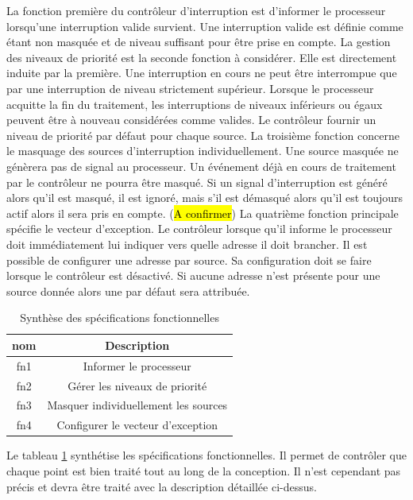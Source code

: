 \gap

La fonction première du contrôleur d'interruption est d'informer le processeur lorsqu'une interruption valide survient.
Une interruption valide est définie comme étant non masquée et de niveau suffisant pour être prise en compte.
La gestion des niveaux de priorité est la seconde fonction à considérer. 
Elle est directement induite par la première.
Une interruption en cours ne peut être interrompue que par une interruption de niveau strictement supérieur.
Lorsque le processeur acquitte la fin du traitement, les interruptions de niveaux inférieurs ou égaux peuvent être à nouveau considérées comme valides. 
Le contrôleur fournir un niveau de priorité par défaut pour chaque source.
La troisième fonction concerne le masquage des sources d'interruption individuellement.
Une source masquée ne génèrera pas de signal au processeur.
Un événement déjà en cours de traitement par le contrôleur ne pourra être masqué. %
Si un signal d'interruption est généré alors qu'il est masqué, il est ignoré, mais s'il est démasqué alors qu'il est toujours actif alors il sera pris en compte. (\hl{A confirmer})
La quatrième fonction principale spécifie le vecteur d'exception.
Le contrôleur lorsque qu'il informe le processeur doit immédiatement lui indiquer vers quelle adresse il doit brancher.
Il est possible de configurer une adresse par source.
Sa configuration doit se faire lorsque le contrôleur est désactivé.
Si aucune adresse n'est présente pour une source donnée alors une par défaut sera attribuée.

\begin{table}[H]
	\centering
	\begin{tabular}{|c|c|}
		\hline
		nom & Description \\ \hline
		fn1 & Informer le processeur \\ \hline
		fn2 & Gérer les niveaux de priorité \\ \hline
		fn3 & Masquer individuellement les sources \\ \hline
		fn4 & Configurer le vecteur d'exception \\ \hline
	\end{tabular}
	\caption{Synthèse des spécifications fonctionnelles}
	\label{tab:spe_funct}
\end{table}

Le tableau \ref{tab:spe_funct} synthétise les spécifications fonctionnelles. 
Il permet de contrôler que chaque point est bien traité tout au long de la conception. 
Il n'est cependant pas précis et devra être traité avec la description détaillée ci-dessus.

